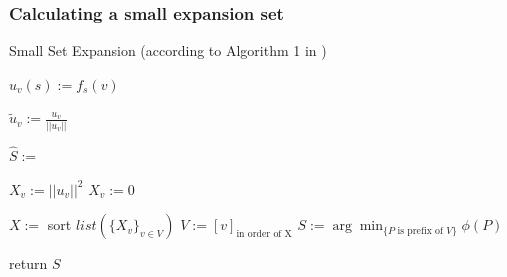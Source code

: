 \documentclass{beamer}
\begin{document}
\begin{frame}
\frametitle{Calculating a small expansion set}

\end{frame}
\begin{frame}

\begin{algorithm}[H]
\caption{Small Set Expansion (according to Algorithm 1 in \cite{ChanLTZ16}) \label{alg:small_set_expansion}} %


\begin{algorithmic}

\State	$u_v(s) := f_s(v) $
\EndFor


\State $\tilde{u}_v := \frac{u_v}{||u_v||}$
\EndFor

\State $\hat{S} := $ 


\State $X_v := ||u_v||^2$
\Else
\State $X_v := 0$
\EndIf

\EndFor
\State $X:= $ sort $ list(\{X_v\}_{v \in V})$
\State $V := [v]_{\text{in order of X}}$
\State $S := \arg \min_{\{P \text{ is prefix of }V\}}\phi(P)$

\State return $S$



\EndFunction


\end{algorithmic}
\end{algorithm} %
\end{frame}
\end{document}
